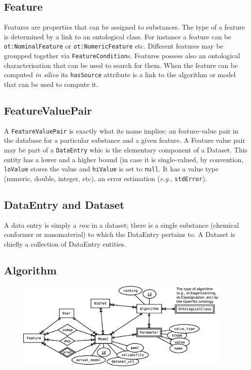 \subsection{Feature}
Features are properties that can be assigned to substances. The type of
a feature is determined by a link to an ontological class. For instance
a feature can be \texttt{ot:NominalFeature} or \texttt{ot:NumericFeature}
etc. Different features may be groupped together via \texttt{FeatureCondition}s.
Features possess also an ontological characterisation that can be 
used to search for them. When the feature can be computed \textit{in silico}
its \texttt{hasSource} attribute
is a link to the algorithm or model that can be used to compute it.


\subsection{FeatureValuePair}
A \texttt{FeatureValuePair} is exactly what its name implies: 
an feature-value pair in the database
for a particular substance and a given feature.
A Feature value pair may be part of a \texttt{DataEntry} whic is 
the elementary component of a Dataset. This entity has a lower
and a higher bound (in case it is single-valued, by convention,
\texttt{loValue} stores the value and \texttt{hiValue} is set to 
\texttt{null}. It has a value type (numeric, double, integer, 
etc), an error estimation (\textit{e.g.}, \texttt{stdError}).


\subsection{DataEntry and Dataset}
A data entry is simply a \textit{row} in a dataset;
there is a single substance (chemical conformer or nanomaterial) to which
the DataEntry pertains to. A Dataset is chiefly a collection of 
DataEntry entities. 



\subsection{Algorithm}
\lipsum[1]

\begin{figure}[h]
 \centering
 \includegraphics[keepaspectratio=true,width=0.95\textwidth]{figures/model_algorithm}
\end{figure}

